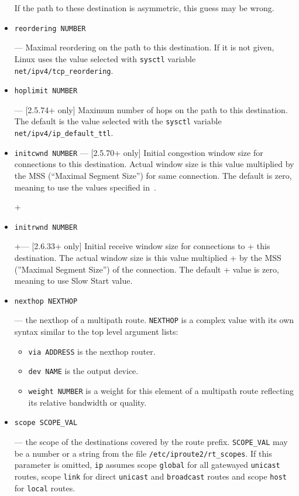 \begin{itemize}
\begin{NB}
  If the path to these destination is asymmetric, this guess may be wrong.
\end{NB}

\item \verb|reordering NUMBER|

--- \threeonly Maximal reordering on the path to this destination.
    If it is not given, Linux uses the value selected with \verb|sysctl|
    variable \verb|net/ipv4/tcp_reordering|.

\item \verb|hoplimit NUMBER|

--- [2.5.74+ only] Maximum number of hops on the path to this destination.
    The default is the value selected with the \verb|sysctl| variable
    \verb|net/ipv4/ip_default_ttl|.

\item \verb|initcwnd NUMBER|
--- [2.5.70+ only] Initial congestion window size for connections to
    this destination. Actual window size is this value multiplied by the
    MSS (``Maximal Segment Size'') for same connection. The default is
    zero, meaning to use the values specified in~\cite{RFC2414}.

+\item \verb|initrwnd NUMBER|
 
+--- [2.6.33+ only] Initial receive window size for connections to 
+    this destination. The actual window size is this value multiplied
+    by the MSS (''Maximal Segment Size'') of the connection. The default
+    value is zero, meaning to use Slow Start value.
 
\item \verb|nexthop NEXTHOP|

--- the nexthop of a multipath route. \verb|NEXTHOP| is a complex value
with its own syntax similar to the top level argument lists:
\begin{itemize}
\item \verb|via ADDRESS| is the nexthop router.
\item \verb|dev NAME| is the output device.
\item \verb|weight NUMBER| is a weight for this element of a multipath
route reflecting its relative bandwidth or quality.
\end{itemize}

\item \verb|scope SCOPE_VAL|

--- the scope of the destinations covered by the route prefix.
\verb|SCOPE_VAL| may be a number or a string from the file
\verb|/etc/iproute2/rt_scopes|.
If this parameter is omitted,
\verb|ip| assumes scope \verb|global| for all gatewayed \verb|unicast|
routes, scope \verb|link| for direct \verb|unicast| and \verb|broadcast| routes
and scope \verb|host| for \verb|local| routes.


\end{itemize}
